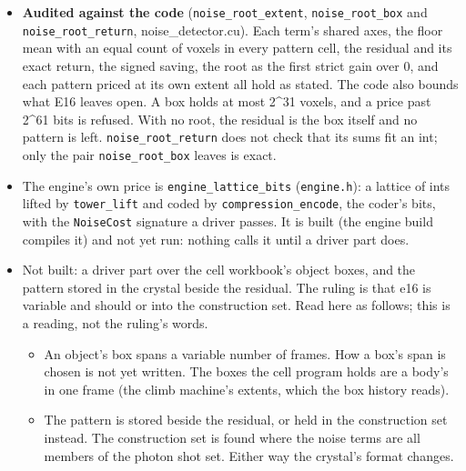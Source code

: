 \begin{itemize}
\begin{itemize}
\item The stack term's pattern is the largest, 16 × 32 × 32 values, against 32 × 32 for the fixed pattern and 16 × 12 for the planes. That it pays last for that reason is a reading; the patterns' own bits were not printed.
\item The noise vector table puts the coherent terms on the kcr set at 1.0\% to 3.0\% of the static background's frame-difference bits (a Gaussian estimate). A real box may hold no root (a reading, still unmeasured).
\end{itemize}
\item \textbf{Audited against the code} (\texttt{noise\_\allowbreak{}root\_\allowbreak{}extent}, \texttt{noise\_\allowbreak{}root\_\allowbreak{}box} and \texttt{noise\_\allowbreak{}root\_\allowbreak{}return}, noise\_\allowbreak{}detector.cu). Each term's shared axes, the floor mean with an equal count of voxels in every pattern cell, the residual and its exact return, the signed saving, the root as the first strict gain over 0, and each pattern priced at its own extent all hold as stated. The code also bounds what E16 leaves open. A box holds at most 2\textasciicircum{}31 voxels, and a price past 2\textasciicircum{}61 bits is refused. With no root, the residual is the box itself and no pattern is left. \texttt{noise\_\allowbreak{}root\_\allowbreak{}return} does not check that its sums fit an int; only the pair \texttt{noise\_\allowbreak{}root\_\allowbreak{}box} leaves is exact.
\item The engine's own price is \texttt{engine\_\allowbreak{}lattice\_\allowbreak{}bits} (\texttt{engine.\allowbreak{}h}): a lattice of ints lifted by \texttt{tower\_\allowbreak{}lift} and coded by \texttt{compression\_\allowbreak{}encode}, the coder's bits, with the \texttt{Noise\allowbreak{}Cost} signature a driver passes. It is built (the engine build compiles it) and not yet run: nothing calls it until a driver part does.
\item Not built: a driver part over the cell workbook's object boxes, and the pattern stored in the crystal beside the residual. The ruling is that e16 is variable and should or into the construction set. Read here as follows; this is a reading, not the ruling's words.

\begin{itemize}
\item An object's box spans a variable number of frames. How a box's span is chosen is not yet written. The boxes the cell program holds are a body's in one frame (the climb machine's extents, which the box history reads).
\item The pattern is stored beside the residual, or held in the construction set instead. The construction set is found where the noise terms are all members of the photon shot set. Either way the crystal's format changes.
\end{itemize}
\end{itemize}

